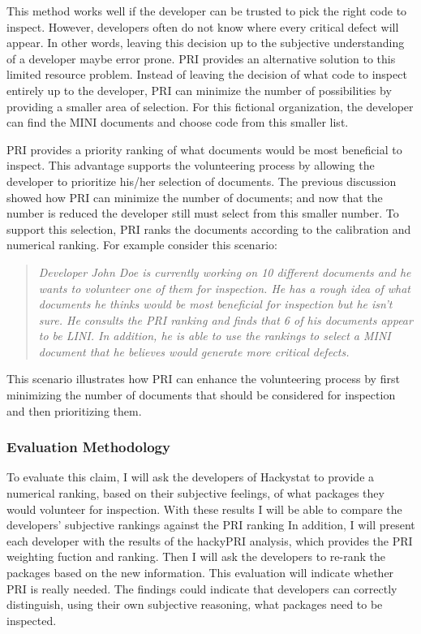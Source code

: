 This method works well if the developer can be trusted to pick the right
code to inspect. However, developers often do not know where every critical
defect will appear. In other words, leaving this decision up to the
subjective understanding of a developer maybe error prone. PRI provides an
alternative solution to this limited resource problem.  Instead of leaving
the decision of what code to inspect entirely up to the developer, PRI can
minimize the number of possibilities by providing a smaller area of
selection. For this fictional organization, the developer can find the MINI
documents and choose code from this smaller list.

PRI provides a priority ranking of what documents would be most beneficial
to inspect. This advantage supports the volunteering process by allowing
the developer to prioritize his/her selection of documents. The previous
discussion showed how PRI can minimize the number of documents; and now
that the number is reduced the developer still must select from this
smaller number. To support this selection, PRI ranks the documents
according to the calibration and numerical ranking. For example consider
this scenario:

\begin{quotation}
  \textit{ Developer John Doe is currently working on 10 different
    documents and he wants to volunteer one of them for inspection. He has
    a rough idea of what documents he thinks would be most beneficial for
    inspection but he isn't sure. He consults the PRI ranking and finds
    that 6 of his documents appear to be LINI. In addition, he is able to
    use the rankings to select a MINI document that he believes would
    generate more critical defects.}
\end{quotation}

This scenario illustrates how PRI can enhance the volunteering process by
first minimizing the number of documents that should be considered for
inspection and then prioritizing them.

\subsubsection{Evaluation Methodology} 
To evaluate this claim, I will ask the developers of Hackystat to provide a
numerical ranking, based on their subjective feelings, of what packages
they would volunteer for inspection. With these results I will be able to
compare the developers' subjective rankings against the PRI ranking In
addition, I will present each developer with the results of the hackyPRI
analysis, which provides the PRI weighting fuction and ranking. Then I will
ask the developers to re-rank the packages based on the new information.
This evaluation will indicate whether PRI is really needed. The findings
could indicate that developers can correctly distinguish, using their own
subjective reasoning, what packages need to be inspected.

